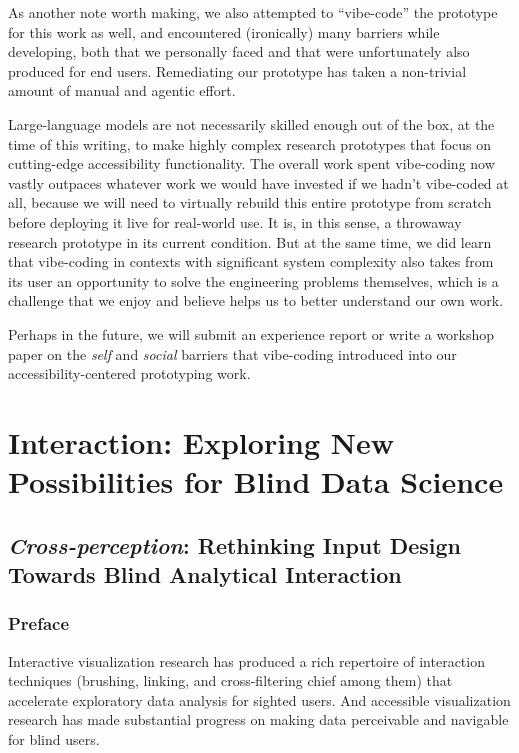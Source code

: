 \documentclass[12pt]{cmuthesis}
\begin{document}
As another note worth making, we also attempted to ``vibe-code'' the prototype for this work as well, and encountered (ironically) many barriers while developing, both that we personally faced and that were unfortunately also produced for end users. Remediating our prototype has taken a non-trivial amount of manual and agentic effort.

Large-language models are not necessarily skilled enough out of the box, at the time of this writing, to make highly complex research prototypes that focus on cutting-edge accessibility functionality. The overall work spent vibe-coding now vastly outpaces whatever work we would have invested if we hadn't vibe-coded at all, because we will need to virtually rebuild this entire prototype from scratch before deploying it live for real-world use. It is, in this sense, a throwaway research prototype in its current condition. But at the same time, we did learn that vibe-coding in contexts with significant system complexity also takes from its user an opportunity to solve the engineering problems themselves, which is a challenge that we enjoy and believe helps us to better understand our own work.

Perhaps in the future, we will submit an experience report or write a workshop paper on the \textit{self} and \textit{social} barriers that vibe-coding introduced into our accessibility-centered prototyping work.

\part{Interaction: Exploring New Possibilities for Blind Data Science}

\chapter{\textit{Cross-perception}: Rethinking Input Design Towards Blind Analytical Interaction}

\section{Preface}

Interactive visualization research has produced a rich repertoire of interaction techniques (brushing, linking, and cross-filtering chief among them) that accelerate exploratory data analysis for sighted users. And accessible visualization research has made substantial progress on making data perceivable and navigable for blind users.
\end{document}
